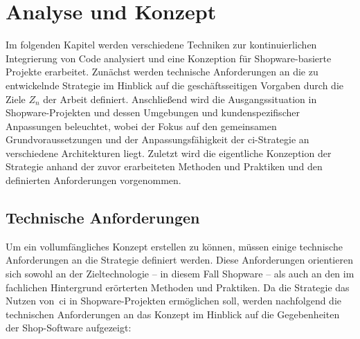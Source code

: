 
\section{Analyse und Konzept} \label{sec:03-concept}

Im folgenden Kapitel werden verschiedene Techniken zur kontinuierlichen Integrierung von Code analysiert und eine
Konzeption für Shopware-basierte Projekte erarbeitet.
Zunächst werden technische Anforderungen an die zu entwickelnde Strategie im Hinblick auf die geschäftsseitigen
Vorgaben durch die Ziele $Z_n$ der Arbeit definiert.
Anschließend wird die Ausgangssituation in Shopware-Projekten und dessen Umgebungen und kundenspezifischer Anpassungen
beleuchtet, wobei der Fokus auf den gemeinsamen Grundvoraussetzungen und der Anpassungsfähigkeit der
\acrshort{ci}-Strategie an verschiedene Architekturen liegt.
Zuletzt wird die eigentliche Konzeption der Strategie anhand der zuvor erarbeiteten Methoden und
Praktiken und den definierten Anforderungen vorgenommen.

\subsection{Technische Anforderungen} \label{subsec:03-concept-1}

Um ein vollumfängliches Konzept erstellen zu können, müssen einige technische Anforderungen an die Strategie definiert
werden.
Diese Anforderungen orientieren sich sowohl an der Zieltechnologie – in diesem Fall Shopware – als auch an den im
fachlichen Hintergrund erörterten Methoden und Praktiken.
Da die Strategie das Nutzen von\ \acrshort{ci} in Shopware-Projekten ermöglichen soll, werden nachfolgend
die technischen Anforderungen an das Konzept im Hinblick auf die Gegebenheiten der Shop-Software aufgezeigt:

